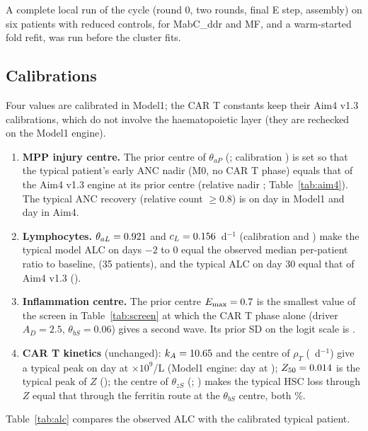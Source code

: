 \documentclass[11pt]{article}
\begin{document}
A complete local run of the cycle (round 0, two rounds, final E step, assembly) on six patients with reduced controls, for MabC\_ddr and MF, and a warm-started fold refit, was run before the cluster fits.

\subsection{Calibrations}
Four values are calibrated in Model1; the CAR T constants keep their Aim4 v1.3 calibrations, which do not involve the haematopoietic layer (they are rechecked on the Model1 engine).
\begin{enumerate}
\item \textbf{MPP injury centre.} The prior centre of $\theta_{aP}$ (\valThapCentre; calibration \valThapCal) is set so that the typical patient's early ANC nadir (M0, no CAR T phase) equals that of the Aim4 v1.3 engine at its prior centre \valThapAimFour{} (relative nadir \valAncNadirAimFour; Table~\ref{tab:aim4}). The typical ANC recovery (relative count $\geq0.8$) is on day \valAncRecModel{} in Model1 and day \valAncRecAimFour{} in Aim4.
\item \textbf{Lymphocytes.} $\theta_{aL}=0.921$ and $c_L=0.156$~d$^{-1}$ (calibration \valThalCal{} and \valClCal) make the typical model ALC on days $-2$ to 0 equal the observed median per-patient ratio to baseline, \valAlcTarget{} (35 patients), and the typical ALC on day 30 equal that of Aim4 v1.3 (\valAlcDayThirty).
\item \textbf{Inflammation centre.} The prior centre $E_{\max}=0.7$ is the smallest value of the screen in Table~\ref{tab:screen} at which the CAR T phase alone (driver $A_D=2.5$, $\theta_{bS}=0.06$) gives a second wave. Its prior SD on the logit scale is \valEmaxSd.
\item \textbf{CAR T kinetics} (unchanged): $k_A=10.65$ and the centre of $\rho_T$ (\valRhoCentre~d$^{-1}$) give a typical peak on day \valCartPeakDay{} at \valCartPeak{} $\times10^9$/L (Model1 engine: day \valCartPeakDayModel{} at \valCartPeakModel); $Z_{50}=0.014$ is the typical peak of $Z$ (\valZfiftyModel); the centre of $\theta_{zS}$ (\valThzs; \valThzsModel) makes the typical HSC loss through $Z$ equal that through the ferritin route at the $\theta_{bS}$ centre, both \valRouteLoss\%.
\end{enumerate}
Table~\ref{tab:alc} compares the observed ALC with the calibrated typical patient.




\end{document}
